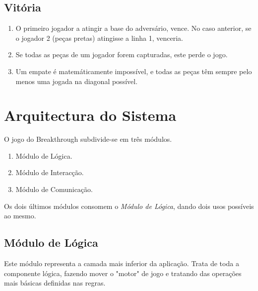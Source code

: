 \documentclass[15pt,a4paper]{article}
\begin{document}
\subsection{Vitória}
\begin{enumerate}
\item O primeiro jogador a atingir a base do adversário, vence. No caso anterior, se o jogador 2 (peças pretas) atingisse a linha 1, venceria.
\item Se todas as peças de um jogador forem capturadas, este perde o jogo.
\item Um empate é matemáticamente impossível, e todas as peças têm sempre pelo menos uma jogada na diagonal possível.
\end{enumerate}


\newpage

\section{Arquitectura do Sistema}

O jogo do Breakthrough subdivide-se em três módulos.

\begin{enumerate}
\item Módulo de Lógica.
\item Módulo de Interacção.
\item Módulo de Comunicação.
\end{enumerate}

Os dois últimos módulos consomem o \textit{Módulo de Lógica}, dando dois usos possíveis ao mesmo.




\subsection{Módulo de Lógica}

Este módulo representa a camada mais inferior da aplicação.
Trata de toda a componente lógica, fazendo mover o "motor" de jogo e tratando das
operações mais básicas definidas nas regras.
\end{document}
